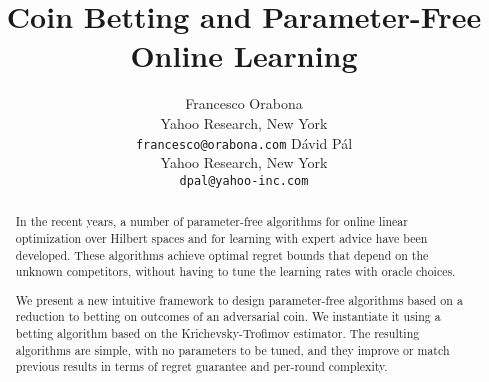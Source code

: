 \documentclass{article}
\author{
  Francesco Orabona\\
  Yahoo Research, New York\\
  \texttt{francesco@orabona.com}
  \And
  D\'avid P\'al\\
  Yahoo Research, New York\\
  \texttt{dpal@yahoo-inc.com}
}
\title{Coin Betting and Parameter-Free Online Learning}
\begin{document}
\maketitle

\begin{abstract}
In the recent years, a number of parameter-free algorithms for online linear
optimization over Hilbert spaces and for learning with expert advice have been
developed. These algorithms achieve optimal regret bounds that depend on the
unknown competitors, without having to tune the learning rates with oracle
choices.

We present a new intuitive framework to design parameter-free algorithms based
on a reduction to betting on outcomes of an adversarial coin. We instantiate it
using a betting algorithm based on the Krichevsky-Trofimov estimator.  The
resulting algorithms are simple, with no parameters to be tuned, and they improve
or match previous results in terms of regret guarantee and per-round
complexity.
\end{abstract}

\vspace{-0.2cm}












\begin{small}
\newpage
\setlength{\bibsep}{0pt}


\end{small}

\appendix





\end{document}
